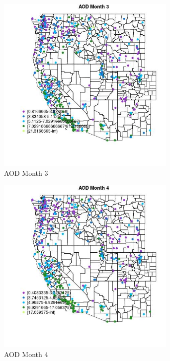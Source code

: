 \begin{figure} 
\centering  
\includegraphics[width=0.77\textwidth]{Code_Outputs/ML_input_report_ML_input_PM25_Step5_part_d_de_duplicated_aves_ML_input_MapObsMo3AOD.jpg} 
\caption{\label{fig:ML_input_report_ML_input_PM25_Step5_part_d_de_duplicated_aves_ML_inputMapObsMo3AOD}AOD Month 3} 
\end{figure} 
 

\clearpage 

\begin{figure} 
\centering  
\includegraphics[width=0.77\textwidth]{Code_Outputs/ML_input_report_ML_input_PM25_Step5_part_d_de_duplicated_aves_ML_input_MapObsMo4AOD.jpg} 
\caption{\label{fig:ML_input_report_ML_input_PM25_Step5_part_d_de_duplicated_aves_ML_inputMapObsMo4AOD}AOD Month 4} 
\end{figure} 
 

